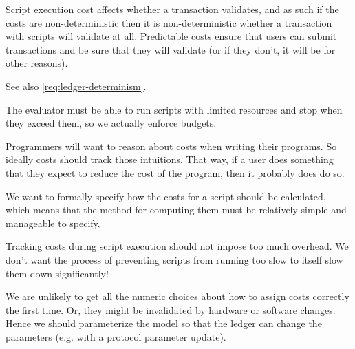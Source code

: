 \begin{requirement}[Determinism]
\label{req:costing-determinism}
Script execution cost affects whether a transaction validates, and as such if the costs are non-deterministic then it is non-deterministic whether a transaction with scripts will validate at all.
Predictable costs ensure that users can submit transactions and be sure that they will validate (or if they don't, it will be for other reasons).

See also \cref{req:ledger-determinism}.
\end{requirement}

\begin{requirement}
\label{req:costing-abort}
The evaluator must be able to run scripts with limited resources and stop when they exceed them, so we actually enforce budgets.
\end{requirement}

\begin{requirement}
\label{req:costing-intuitive}
Programmers will want to reason about costs when writing their programs.
So ideally costs should track those intuitions.
That way, if a user does something that they expect to reduce the cost of the program, then it probably does do so.
\end{requirement}

\begin{requirement}[Specifiablity]
\label{req:costing-specifiable}
We want to formally specify how the costs for a script should be calculated, which means that the method for computing them must be relatively simple and manageable to specify.
\end{requirement}

\begin{requirement}
\label{req:costing-overhead}
Tracking costs during script execution should not impose too much overhead.
We don't want the process of preventing scripts from running too slow to itself slow them down significantly!
\end{requirement}

\begin{requirement}
\label{req:costing-parameters}
We are unlikely to get all the numeric choices about how to assign costs correctly the first time.
Or, they might be invalidated by hardware or software changes.
Hence we should parameterize the model so that the ledger can change the parameters (e.g. with a protocol parameter update).
\end{requirement}

